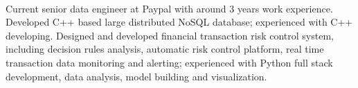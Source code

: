 \documentclass[11pt, a4paper, UTF8]{awesome-cv}
\begin{document}
\makecvheader[R]

\makecvfooter
  {\ }
  {\ }
  {\ }




\begin{cvparagraph}
Current senior data engineer at Paypal with around 3 years work experience. Developed C++ based large distributed NoSQL database; experienced with C++ developing. Designed and developed financial transaction risk control system, including decision rules analysis, automatic risk control platform, real time transaction data monitoring and alerting; experienced with Python full stack development, data analysis, model building and visualization.
\end{cvparagraph}
\end{document}
